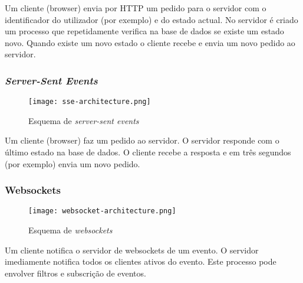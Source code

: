 Um cliente (browser) envia por HTTP um pedido para o servidor com o identificador do utilizador (por exemplo) e do estado actual. No servidor é criado um processo que repetidamente verifica na base de dados se existe um estado novo. Quando existe um novo estado o cliente recebe e envia um novo pedido ao servidor.

\subsubsection{\textit{Server-Sent Events}}

\begin{figure}[H]
\centering
\texttt{[image: sse-architecture.png]}
\caption{Esquema de \textit{server-sent events}}
\label{fig:sse-architecture}
\end{figure}

Um cliente (browser) faz um pedido ao servidor. O servidor responde com o último estado na base de dados. O cliente recebe a resposta e em três segundos (por exemplo) envia um novo pedido.

\subsubsection{Websockets}

\begin{figure}[H]
\centering
\texttt{[image: websocket-architecture.png]}
\caption{Esquema de \textit{websockets}}
\label{fig:websockets-architecture}
\end{figure}

Um cliente notifica o servidor de websockets de um evento. O servidor imediamente notifica todos os clientes ativos do evento. Este processo pode envolver filtros e subscrição de eventos.






